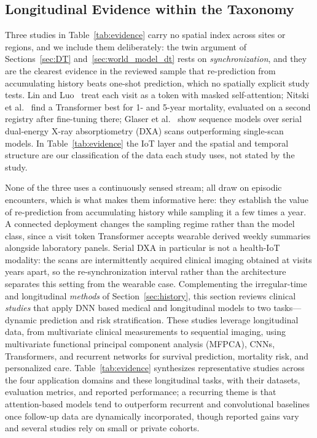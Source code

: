 \documentclass[journal]{IEEEtran}
\newif\ifsubmission
\begin{document}
\subsection{Longitudinal Evidence within the Taxonomy}
\label{sec:longitudinal}
\ifsubmission
Three studies in Table~\ref{tab:evidence} carry no spatial index across sites or regions, and we include them deliberately: the twin argument of Sections~\ref{sec:DT} and~\ref{sec:world_model_dt} rests on \emph{synchronization}, and they are the clearest evidence in the reviewed sample that re-prediction from accumulating history beats one-shot prediction, which no spatially explicit study tests. Lin and Luo~\cite{lin2022deep} treat each visit as a token with masked self-attention; Nitski et al.~\cite{nitski2021long} find a Transformer best for 1- and 5-year mortality, evaluated on a second registry after fine-tuning there; Glaser et al.~\cite{glaser2022deep} show sequence models over serial dual-energy X-ray absorptiometry (DXA) scans outperforming single-scan models. In Table~\ref{tab:evidence} the IoT layer and the spatial and temporal structure are our classification of the data each study uses, not stated by the study.

None of the three uses a continuously sensed stream; all draw on episodic encounters, which is what makes them informative here: they establish the value of re-prediction from accumulating history while sampling it a few times a year. A connected deployment changes the sampling regime rather than the model class, since a visit token Transformer accepts wearable derived weekly summaries alongside laboratory panels. Serial DXA in particular is not a health-IoT modality: the scans are intermittently acquired clinical imaging obtained at visits years apart, so the re-synchronization interval rather than the architecture separates this setting from the wearable case.
\else
Complementing the irregular-time and longitudinal \emph{methods} of Section~\ref{sec:history}, this section reviews clinical \emph{studies} that apply DNN based medical and longitudinal models to two tasks---dynamic prediction and risk stratification. These studies leverage longitudinal data, from multivariate clinical measurements to sequential imaging, using multivariate functional principal component analysis (MFPCA), CNNs, Transformers, and recurrent networks for survival prediction, mortality risk, and personalized care. Table~\ref{tab:evidence} synthesizes representative studies across the four application domains and these longitudinal tasks, with their datasets, evaluation metrics, and reported performance; a recurring theme is that attention-based models tend to outperform recurrent and convolutional baselines once follow-up data are dynamically incorporated, though reported gains vary and several studies rely on small or private cohorts.
\end{document}
